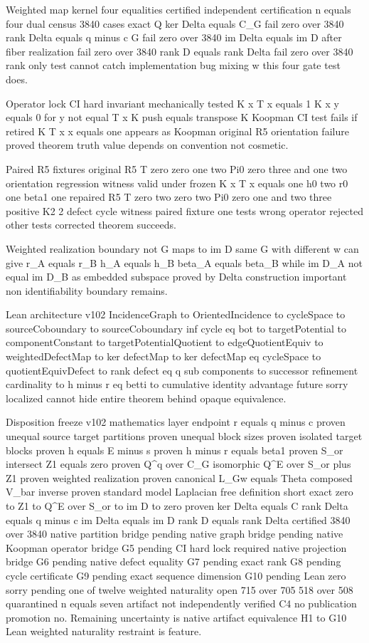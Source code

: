 Weighted map kernel four equalities certified independent certification n equals four dual census 3840 cases exact Q ker Delta equals C_G fail zero over 3840 rank Delta equals q minus c G fail zero over 3840 im Delta equals im D after fiber realization fail zero over 3840 rank D equals rank Delta fail zero over 3840 rank only test cannot catch implementation bug mixing w this four gate test does.

Operator lock CI hard invariant mechanically tested K x T x equals 1 K x y equals 0 for y not equal T x K push equals transpose K Koopman CI test fails if retired K T x x equals one appears as Koopman original R5 orientation failure proved theorem truth value depends on convention not cosmetic.

Paired R5 fixtures original R5 T zero zero one two Pi0 zero three and one two orientation regression witness valid under frozen K x T x equals one h0 two r0 one beta1 one repaired R5 T zero two zero two Pi0 zero one and two three positive K2 2 defect cycle witness paired fixture one tests wrong operator rejected other tests corrected theorem succeeds.

Weighted realization boundary not G maps to im D same G with different w can give r_A equals r_B h_A equals h_B beta_A equals beta_B while im D_A not equal im D_B as embedded subspace proved by Delta construction important non identifiability boundary remains.

Lean architecture v102 IncidenceGraph to OrientedIncidence to cycleSpace to sourceCoboundary to sourceCoboundary inf cycle eq bot to targetPotential to componentConstant to targetPotentialQuotient to edgeQuotientEquiv to weightedDefectMap to ker defectMap to ker defectMap eq cycleSpace to quotientEquivDefect to rank defect eq q sub components to successor refinement cardinality to h minus r eq betti to cumulative identity advantage future sorry localized cannot hide entire theorem behind opaque equivalence.

Disposition freeze v102 mathematics layer endpoint r equals q minus c proven unequal source target partitions proven unequal block sizes proven isolated target blocks proven h equals E minus s proven h minus r equals beta1 proven S_or intersect Z1 equals zero proven Q^q over C_G isomorphic Q^E over S_or plus Z1 proven weighted realization proven canonical L_Gw equals Theta composed V_bar inverse proven standard model Laplacian free definition short exact zero to Z1 to Q^E over S_or to im D to zero proven ker Delta equals C rank Delta equals q minus c im Delta equals im D rank D equals rank Delta certified 3840 over 3840 native partition bridge pending native graph bridge pending native Koopman operator bridge G5 pending CI hard lock required native projection bridge G6 pending native defect equality G7 pending exact rank G8 pending cycle certificate G9 pending exact sequence dimension G10 pending Lean zero sorry pending one of twelve weighted naturality open 715 over 705 518 over 508 quarantined n equals seven artifact not independently verified C4 no publication promotion no. Remaining uncertainty is native artifact equivalence H1 to G10 Lean weighted naturality restraint is feature.

